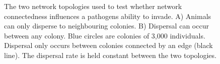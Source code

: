 \begin{figure}[t]
{\centering 
{}
}
\caption[Network topologies used to compare network connectedness]{
The two network topologies used to test whether network connectedness influences a pathogens ability to invade.
A) Animals can only disperse to neighbouring colonies. 
B) Dispersal can occur between any colony.
Blue circles are colonies of 3,000 individuals.
Dispersal only occurs between colonies connected by an edge (black line).
The dispersal rate is held constant between the two topologies.
}
\label{f:net}
\end{figure}























